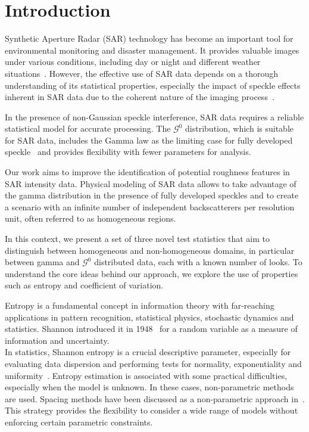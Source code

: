 \documentclass[remotesensing,article,submit,moreauthors,pdftex]{Definitions/mdpi}
\begin{document}

\setlength{\tabcolsep}{6pt} 
\newcommand{\bias}{\operatorname{Bias}}
\newcommand{\widebar}[1]{\overline{#1}}

\hypertarget{sec:Introduction}{%
\section{Introduction}\label{sec:Introduction}}

Synthetic Aperture Radar (SAR) technology has become an important tool for environmental monitoring and disaster management. It provides valuable images under various conditions, including day or night and different weather situations~\cite{Moreira2013,Mu2019}. However, the effective use of SAR data depends on a thorough understanding of its statistical properties, especially the impact of speckle effects inherent in SAR data due to the coherent nature of the imaging process~\cite{Argenti2013}.

In the presence of non-Gaussian speckle interference, SAR data requires a reliable statistical model for accurate processing. The
\(\mathcal{G}^0\) distribution, which is suitable for SAR data, includes the
Gamma law as the limiting case for fully developed speckle~\cite{Ferreira2020} and provides flexibility with fewer parameters for analysis.

Our work aims to improve the identification of potential roughness features in SAR intensity data. Physical modeling of SAR data allows to take advantage of the gamma distribution in the presence of fully developed speckles and to create a scenario with an infinite number of independent backscatterers per resolution unit, often referred to as homogeneous regions.

In this context, we present a set of three novel test statistics that aim to distinguish between homogeneous and non-homogeneous domains, in particular between gamma and
\(\mathcal{G}^0\) distributed data, each with a known number of looks. To understand the core ideas behind our approach, we explore the use of properties such as entropy and coefficient of variation.

Entropy is a fundamental concept in information theory with far-reaching applications in pattern recognition, statistical physics, stochastic dynamics and statistics. Shannon introduced it in 1948~\cite{Shannon1948} for a random variable as a measure of information and uncertainty.\\
In statistics, Shannon entropy is a crucial descriptive parameter, especially for evaluating data dispersion and performing tests for normality, exponentiality and uniformity~\cite{Wieczorkowski1999,Zamanzade2012}. Entropy estimation is associated with some practical difficulties, especially when the model is unknown. In these cases, non-parametric methods are used.
Spacing methods have been discussed as a non-parametric approach in~\cite{AlizadehNoughabi2010,Subhash2021}. This strategy provides the flexibility to consider a wide range of models without enforcing certain parametric constraints.
\end{document}
